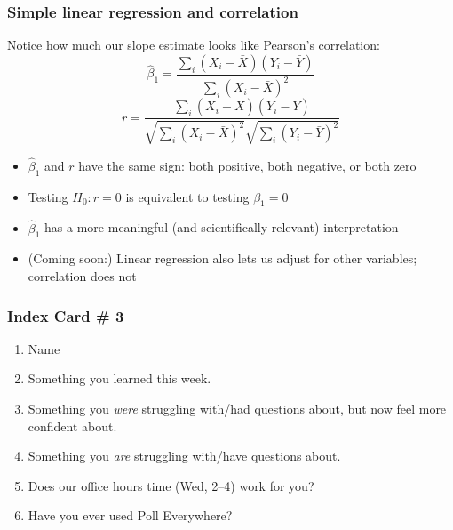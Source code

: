\documentclass[12pt, 
hyperref={colorlinks=true, linkcolor=blue, urlcolor=cyan}]{beamer}
\begin{document}
\begin{frame}
\frametitle{Simple linear regression and correlation}

Notice how much our slope estimate looks like Pearson's correlation: 
$$\hat\beta_1 = \frac{\sum_i \left(X_i - \bar{X}\right)\left(Y_i - \bar{Y}\right)}{\sum_i \left(X_i - \bar{X}\right)^2}$$
$$r = \frac{\sum_i \left(X_i - \bar{X}\right)\left(Y_i - \bar{Y}\right)}{\sqrt{\sum_i\left(X_i - \bar{X}\right)^2} \sqrt{\sum_i \left(Y_i - \bar{Y}\right)^2}}$$ \pause

\begin{itemize}\vspace{-0.3cm}
\item $\hat\beta_1$ and $r$ have the same sign: both positive, both negative, or both zero
\item Testing $H_0: r = 0$ is equivalent to testing $\beta_1 = 0$
\item $\hat\beta_1$ has a more meaningful (and scientifically relevant) interpretation
\item (Coming soon:) Linear regression also lets us adjust for other variables; correlation does not
\end{itemize}

\end{frame}


\begin{frame}
\frametitle{Index Card \# 3}

\begin{enumerate}
\item Name
\item Something you learned this week.
\item Something you \textit{were} struggling with/had questions about, but now feel more confident about.
\item Something you \textit{are} struggling with/have questions about.
\item Does our office hours time (Wed, 2--4) work for you?
\item Have you ever used Poll Everywhere?
\end{enumerate}

\end{frame}
\end{document}
